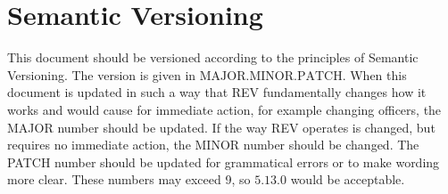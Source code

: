 \section{Semantic Versioning}
\label{constitution_semver}

This document should be versioned according to the principles of Semantic Versioning. The version is given in $\text{MAJOR}.\text{MINOR}.\text{PATCH}$. When this document is updated in such a way that REV fundamentally changes how it works and would cause for immediate action, for example changing officers, the MAJOR number should be updated. If the way REV operates is changed, but requires no immediate action, the MINOR number should be changed. The PATCH number should be updated for grammatical errors or to make wording more clear. These numbers may exceed 9, so $5.13.0$ would be acceptable.